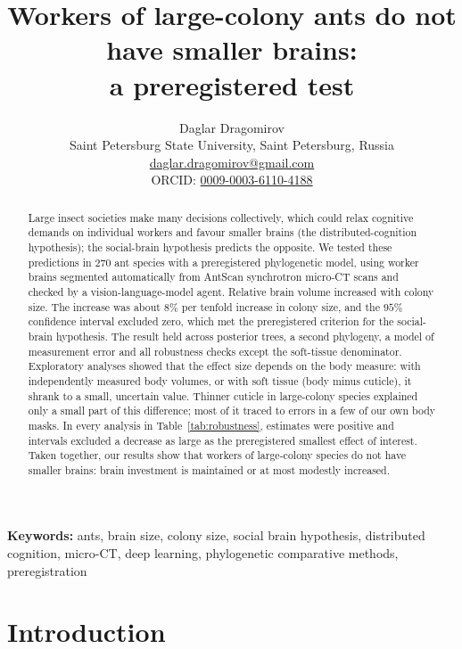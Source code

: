 \documentclass[11pt]{article}
\title{Workers of large-colony ants do not have smaller brains:\\a preregistered test}
\author{Daglar Dragomirov\\[2pt]
\normalsize Saint Petersburg State University, Saint Petersburg, Russia\\
\normalsize \href{mailto:daglar.dragomirov@gmail.com}{daglar.dragomirov@gmail.com}\\
\normalsize ORCID: \href{https://orcid.org/0009-0003-6110-4188}{0009-0003-6110-4188}}
\date{}
\begin{document}
\maketitle

\begin{abstract}
Large insect societies make many decisions collectively, which could relax cognitive demands on individual workers
and favour smaller brains (the distributed-cognition hypothesis); the social-brain hypothesis predicts the opposite.
We tested these predictions in $270$ ant species with a preregistered phylogenetic model, using worker brains
segmented automatically from AntScan synchrotron micro-CT scans and checked by a vision-language-model agent.
Relative brain volume increased with colony size. The increase was about $8\%$ per tenfold increase in colony size,
and the $95\%$ confidence interval excluded zero, which met the preregistered criterion for the social-brain
hypothesis. The result held across posterior trees, a second phylogeny, a model of measurement error and all
robustness checks except the soft-tissue denominator. Exploratory analyses showed that the effect size depends on the
body measure: with independently measured body volumes, or with soft tissue (body minus cuticle), it shrank to a
small, uncertain value. Thinner cuticle in large-colony species explained only a small part of this difference; most
of it traced to errors in a few of our own body masks. In every analysis in Table~\ref{tab:robustness}, estimates were
positive and intervals excluded a decrease as large as the preregistered smallest effect of interest. Taken together,
our results show that workers of large-colony species do not have smaller brains: brain investment is maintained or
at most modestly increased.
\end{abstract}

\begin{small}
\noindent\textbf{Keywords:} ants, brain size, colony size, social brain hypothesis, distributed cognition, micro-CT,
deep learning, phylogenetic comparative methods, preregistration

\end{small}

\section{Introduction}\label{sec:intro}
\end{document}
